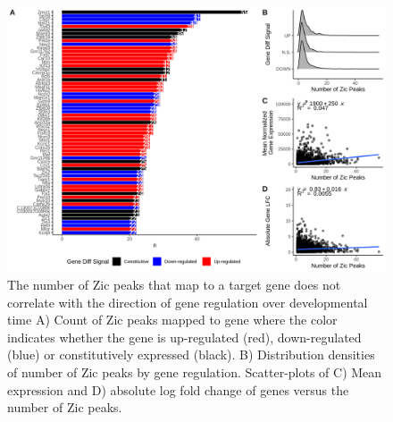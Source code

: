 \documentclass[fleqn,10pt]{wlscirep}
\begin{document}
\begin{figure}[ht]
\centering
\includegraphics[width=.90\linewidth]{../figures/supp_figure3.png}
\caption{ The number of Zic peaks that map to a target gene does not correlate with the direction of gene regulation over developmental time A) Count of Zic peaks mapped to gene where the color indicates whether the gene is up-regulated (red), down-regulated (blue) or constitutively expressed (black). B) Distribution densities of number of Zic peaks by gene regulation.  Scatter-plots of C) Mean expression and D) absolute log fold change of genes versus the number of Zic peaks. }
\label{fig:nPeakstoGenes}
\end{figure}




\end{document}
